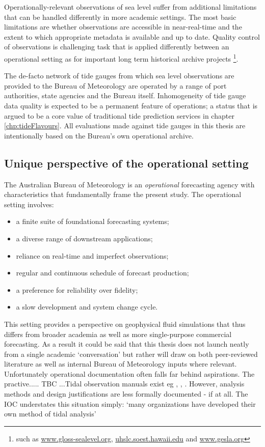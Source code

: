 Operationally-relevant observations of sea level suffer from additional limitations that can be handled differently in more academic settings.   The most basic limitations are whether observations are accessible in near-real-time and the extent to which appropriate metadata is available and up to date.  
Quality control of observations is challenging task that is applied differently between an operational setting as for important long term historical archive projects \footnote{such as \url{www.gloss-sealevel.org}, \url{uhslc.soest.hawaii.edu} and \url{www.gesla.org}}.

The de-facto network of tide gauges from which sea level observations are provided to the Bureau of Meteorology are operated by a range of port authorities, state agencies and the Bureau itself. Inhomogeneity of tide gauge data quality is expected to be a permanent feature of operations; a status that is argued to be a core value of traditional tide prediction services in chapter \ref{chp:tideFlavours}. All evaluations made against tide gauges in this thesis are intentionally based on the Bureau's own operational archive.

\subsection{Unique perspective of the operational setting}
\label{S:operational_setting}

The Australian Bureau of Meteorology is an \emph{operational} forecasting agency with characteristics that fundamentally frame the present study. The operational setting involves:
\begin{itemize}
    \item a finite suite of foundational forecasting systems;
    \item a diverse range of downstream applications;
    \item reliance on real-time and imperfect observations;
    \item regular and continuous schedule of forecast production;
    \item a preference for reliability over fidelity;
    \item a slow development and system change cycle.
\end{itemize}
This setting provides a perspective on geophysical fluid simulations that thus differs from broader academia as well as more single-purpose commercial forecasting.   As a result it could be said that this thesis does not launch neatly from a single academic `conversation' \citep{Booth:2009vy} but rather will draw on both peer-reviewed literature as well as internal Bureau of Meteorology inputs where relevant.
Unfortunately operational documentation often falls far behind aspirations.  The practive..... TBC   ...Tidal observation manuals exist eg \citep{IOC:2005tj}, \citep{Level:2011wu}, \citep{Parker:2007wq}.  However, analysis methods and design justifications are less formally documented - if at all.  The IOC understates this situation simply: `many organizations have developed their own method of tidal analysis'\citep{IOC:2005tj}\\

